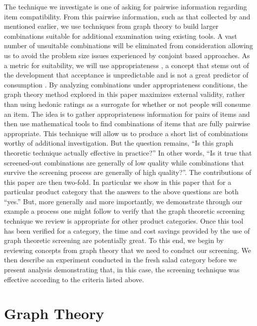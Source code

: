 The technique we investigate is one of asking for pairwise information regarding item compatibility.  From this pairwise information, such as that collected by \citet{Worsley1984} and mentioned earlier, we use techniques from graph theory to build larger combinations suitable for additional examination using existing tools.  A vast number of unsuitable combinations will be eliminated from consideration allowing us to avoid the problem size issues experienced by conjoint based approaches.  As a metric for suitability, we will use appropriateness \citep{Schutz1988}, a concept that stems out of the development that acceptance is unpredictable and is not a great predictor of consumption \citep{Sidel1972}. By analyzing combinations under appropriateness conditions, the graph theory method explored in this paper maximizes external validity, rather than using hedonic ratings as a surrogate for whether or not people will consume an item.  The idea is to gather appropriateness information for pairs of items and then use mathematical tools to find combinations of items that are fully pairwise appropriate.  This technique will allow us to produce a short list of combinations worthy of additional investigation.  But the question remains, “Is this graph theoretic technique actually effective in practice?”  In other words, “Is it true that screened-out combinations are generally of low quality while combinations that survive the screening process are generally of high quality?”.  The contributions of this paper are then two-fold.  In particular we show in this paper that for a particular product category that the answers to the above questions are both “yes.”  But, more generally and more importantly, we demonstrate through our example a process one might follow to verify that the graph theoretic screening technique we review is appropriate for other product categories.  Once this tool has been verified for a category, the time and cost savings provided by the use of graph theoretic screening are potentially great.  To this end, we begin by reviewing concepts from graph theory that we need to conduct our screening.  We then describe an experiment conducted in the fresh salad category before we present analysis demonstrating that, in this case, the screening technique was effective according to the criteria listed above.  

\section{Graph Theory}


